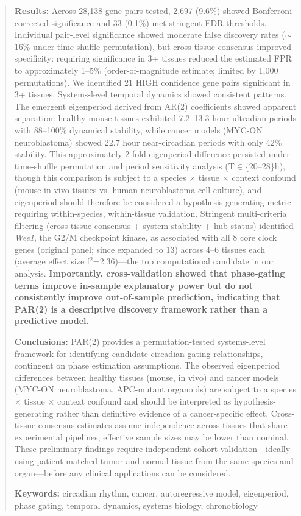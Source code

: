 \documentclass[11pt,a4paper]{article}
\begin{document}
\begin{abstract}
\textbf{Results:} Across 28,138 gene pairs tested, 2,697 (9.6\%) showed Bonferroni-corrected significance and 33 (0.1\%) met stringent FDR thresholds. Individual pair-level significance showed moderate false discovery rates ($\sim$16\% under time-shuffle permutation), but cross-tissue consensus improved specificity: requiring significance in 3+ tissues reduced the estimated FPR to approximately 1--5\% (order-of-magnitude estimate; limited by 1,000 permutations). We identified 21 HIGH confidence gene pairs significant in 3+ tissues. Systems-level temporal dynamics showed consistent patterns. The emergent eigenperiod derived from AR(2) coefficients showed apparent separation: healthy mouse tissues exhibited 7.2--13.3 hour ultradian periods with 88--100\% dynamical stability, while cancer models (MYC-ON neuroblastoma) showed 22.7 hour near-circadian periods with only 42\% stability. This approximately 2-fold eigenperiod difference persisted under time-shuffle permutation and period sensitivity analysis (T$\in$\{20--28\}h), though this comparison is subject to a species $\times$ tissue $\times$ context confound (mouse in vivo tissues vs. human neuroblastoma cell culture), and eigenperiod should therefore be considered a hypothesis-generating metric requiring within-species, within-tissue validation. Stringent multi-criteria filtering (cross-tissue consensus + system stability + hub status) identified \textit{Wee1}, the G2/M checkpoint kinase, as associated with all 8 core clock genes (original panel; since expanded to 13) across 4--6 tissues each (average effect size f$^2$=2.36)---the top computational candidate in our analysis. \textbf{Importantly, cross-validation showed that phase-gating terms improve in-sample explanatory power but do not consistently improve out-of-sample prediction, indicating that PAR(2) is a descriptive discovery framework rather than a predictive model.}

\textbf{Conclusions:} PAR(2) provides a permutation-tested systems-level framework for identifying candidate circadian gating relationships, contingent on phase estimation assumptions. The observed eigenperiod differences between healthy tissues (mouse, in vivo) and cancer models (MYC-ON neuroblastoma, APC-mutant organoids) are subject to a species $\times$ tissue $\times$ context confound and should be interpreted as hypothesis-generating rather than definitive evidence of a cancer-specific effect. Cross-tissue consensus estimates assume independence across tissues that share experimental pipelines; effective sample sizes may be lower than nominal. These preliminary findings require independent cohort validation---ideally using patient-matched tumor and normal tissue from the same species and organ---before any clinical applications can be considered.

\textbf{Keywords:} circadian rhythm, cancer, autoregressive model, eigenperiod, phase gating, temporal dynamics, systems biology, chronobiology
\end{abstract}
\end{document}
